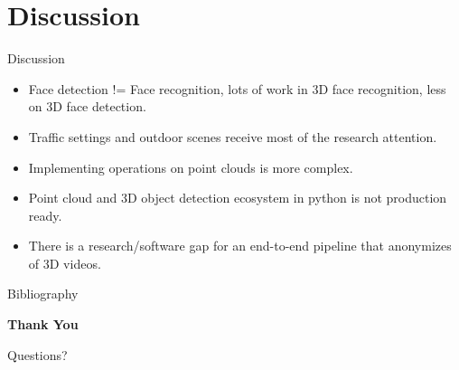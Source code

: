 \documentclass{beamer}
\begin{document}
\section{Discussion}
\begin{frame}{Discussion}
	\begin{itemize}
		\item Face detection != Face recognition, lots of work in 3D face recognition, less on 3D face detection.
		\item Traffic settings and outdoor scenes receive most of the research attention.
		\item Implementing operations on point clouds is more complex.
		\item Point cloud and 3D object detection ecosystem in python is not production ready.
		\item There is a research/software gap for an end-to-end pipeline that anonymizes of 3D videos.
	\end{itemize}
\end{frame}

\begin{frame}[allowframebreaks]{Bibliography}
	
	
\end{frame}

\begin{frame}[plain]
	\centering
	\vspace{2cm}
	{\Huge\bfseries Thank You}

	\vspace{1cm}
	{\Large Questions?}
\end{frame}
\end{document}
